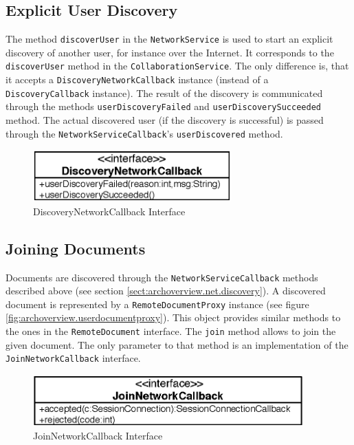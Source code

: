 \subsection{Explicit User Discovery}
The method \texttt{discover\-User} in the \texttt{Network\-Service} is used to 
start an explicit discovery
of another user, for instance over the Internet. It corresponds to the
\texttt{discover\-User} method in the \texttt{Collaboration\-Service}. The
only difference is, that it accepts a \texttt{Discovery\-Network\-Callback}
instance (instead of a \texttt{Discovery\-Callback} instance). The result
of the discovery is communicated through the methods 
\texttt{user\-Discovery\-Failed} and \texttt{user\-Discovery\-Succeeded} method.
The actual discovered user (if the discovery is successful) is passed 
through the \texttt{Network\-Service\-Callback}'s \texttt{user\-Discovered} 
method.

\begin{figure}[H]
 \centering
 \includegraphics[width=7.62cm,height=1.98cm]{../images/finalreport/architecture_discoverynetworkcallback_uml.eps}
 \caption{DiscoveryNetworkCallback Interface}
\end{figure}


\subsection{Joining Documents}
Documents are discovered through the \texttt{Network\-Service\-Callback} methods
described above (see section \ref{sect:archoverview.net.discovery}). A discovered document is represented by a \texttt{Remote\-Document\-Proxy} instance (see figure \ref{fig:archoverview.userdocumentproxy}). 
This object provides similar methods
to the ones in the \texttt{Remote\-Document} interface. The \texttt{join}
method allows to join the given document. The only parameter to that method
is an implementation of the \texttt{Join\-Network\-Callback} interface.

\begin{figure}[H]
 \centering
 \includegraphics[width=10.41cm,height=1.98cm]{../images/finalreport/architecture_joinnetworkcallback_uml.eps}
 \caption{JoinNetworkCallback Interface}
\end{figure}

